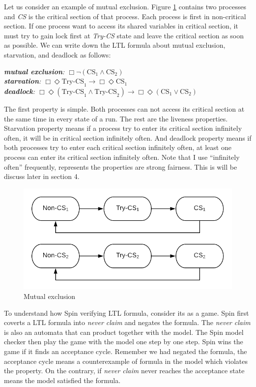 Let us consider an example of mutual exclusion. Figure \ref{fig:mutex} contains two processes and \textit{CS} is the critical section of that process. Each process is first in non-critical section. If one process want to access its shared variables in critical section, it must try to gain lock first at \textit{Try-CS} state and leave the critical section as soon as possible. We can write down the LTL formula about mutual exclusion, starvation, and deadlock as follows:

{\medbreak\indent\textit{\textbf{mutual exclusion}: $\Box\neg(\text{CS}_1\wedge\text{CS}_2)$}}
{\\\indent\textit{\textbf{starvation}: $\Box\Diamond \text{Try-CS}_1\rightarrow\Box\Diamond\text{CS}_1$}}
{\\\indent\textit{\textbf{deadlock}: $\Box\Diamond(\text{Try-CS}_1\wedge\text{Try-CS}_2)\rightarrow\Box\Diamond(\text{CS}_1\vee\text{CS}_2)$}}
\medbreak

The first property is simple. Both processes can not access its critical section at the same time in every state of a run. The rest are the liveness properties. Starvation property means if a process try to enter its critical section infinitely often, it will be in critical section infinitely often. And deadlock property means if both processes try to enter each critical section infinitely often, at least one process can enter its critical section infinitely often. Note that I use ``infinitely often'' frequently, represents the properties are strong fairness. This is will be discuss later in section 4.

\begin{figure}
\includegraphics[width=0.7\linewidth]{img/mutex}
\caption{Mutual exclusion}
\label{fig:mutex}
\end{figure}

To understand how Spin verifying LTL formula, consider its as a game. Spin first coverts a LTL formula into \textit{never claim} and negates the formula. The \textit{never claim} is also an automata that can product together with the model. The Spin model checker then play the game with the model one step by one step. Spin wins the game if it finds an acceptance cycle. Remember we had negated the formula, the acceptance cycle means a counterexample of formula in the model which violates the property. On the contrary, if \textit{never claim} never reaches the acceptance state means the model satisfied the formula.

